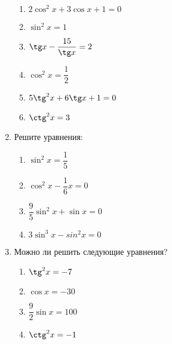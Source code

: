 \documentclass[12pt, a4paper]{article}
\begin{document}
\begin{enumerate}
\begin{multicols}{2}
\begin{enumerate}[label=\asbuk*)]
			\item $2\cos^2x+3\cos x+1=0$
			\item $\sin^2x=1$
			\item $\tg x-\dfrac{15}{\tg x}=2$
			\item $\cos^2x=\dfrac{1}{2}$
			\item $5\tg^2x+6\tg x+1=0$
			\item $\ctg^2x=3$
		\end{enumerate}
	\end{multicols}
		\item Решите уравнения:
		\begin{multicols}{2}
			\begin{enumerate}[label=\asbuk*)]
				\item $\sin^2x=\dfrac{1}{5}$
				\item $\cos^2x-\dfrac{1}{6}x=0$
				\item $\dfrac{9}{5}\sin^2x+\sin x=0$
				\item $3\sin^3x-sin^2x=0$
			\end{enumerate}
		\end{multicols}
		\item Можно ли решить следующие уравнения? 
		\begin{multicols}{2}
			\begin{enumerate}[label=\asbuk*)]
				\item $\tg^2x=-7$
				\item $\cos x=-30$
				\item $\dfrac{9}{2}\sin x=100$
				\item $\ctg^2x=-1$
			\end{enumerate}
		\end{multicols}
	\end{enumerate}
\end{document}
